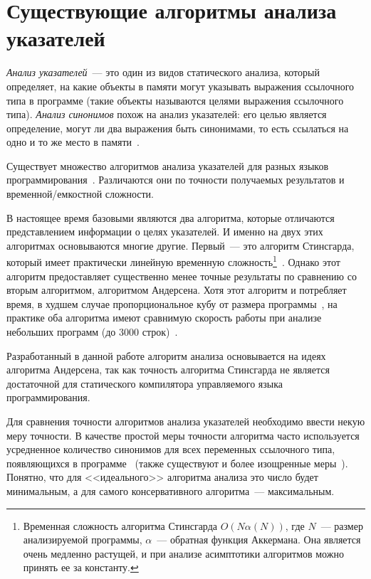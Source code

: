 \documentclass[14pt,titlepage,draft]{extarticle}
\begin{document}
  \section{Существующие алгоритмы анализа указателей}

    \emph{Анализ указателей}~--- это один из видов статического анализа,
    который определяет, на какие объекты в памяти могут указывать выражения
    ссылочного типа в программе (такие объекты называются целями выражения
    ссылочного типа). \emph{Анализ синонимов} похож на анализ указателей: его
    целью является определение, могут ли два выражения быть синонимами, то есть
    ссылаться на одно и то же место в памяти~\cite{andersen}.

    Существует множество алгоритмов анализа указателей для разных языков
    программирования~\cite{hind_pointer_analysis_not_solved_yet}. Различаются
    они по точности получаемых результатов и временной/емкостной сложности.

    В настоящее время базовыми являются два алгоритма, которые отличаются
    представлением информации о целях указателей. И именно на двух этих
    алгоритмах основываются многие другие.
    Первый~--- это алгоритм Стинсгарда, который имеет
    практически линейную временную сложность\footnote{
      Временная сложность алгоритма Стинсгарда
      $O(N \alpha(N))$, где $N$~--- размер анализируемой программы,
      $\alpha$~--- обратная функция Аккермана. Она является очень медленно
      растущей, и при анализе асимптотики алгоритмов можно принять ее за
      константу.
    }~\cite{steensgaard}. Однако этот алгоритм предоставляет существенно менее
    точные результаты по сравнению со вторым алгоритмом, алгоритмом
    Андерсена. Хотя этот алгоритм и потребляет время, в худшем случае
    пропорциональное кубу от размера программы~\cite{andersen}, на практике оба
    алгоритма имеют сравнимую скорость работы при анализе небольших программ
    (до \num{3000} строк)~\cite{shapiro_fast_and_accurate}.

    Разработанный в данной работе алгоритм анализа основывается на идеях
    алгоритма Андерсена, так как точность алгоритма Стинсгарда не является
    достаточной для статического компилятора управляемого языка
    программирования.

    Для сравнения точности алгоритмов анализа указателей необходимо ввести
    некую меру точности. В качестве простой меры точности алгоритма часто
    используется усредненное количество синонимов для всех переменных
    ссылочного типа, появляющихся в
    программе~\cite[раздел~3.2]{hind_pointer_analysis_not_solved_yet}
    (также существуют и более изощренные
    меры~\cite{hind_pointer_analysis_not_solved_yet,diwan_tbaa}).
    Понятно, что для <<идеального>> алгоритма анализа это число будет
    минимальным, а для самого консервативного алгоритма~--- максимальным.
\end{document}
